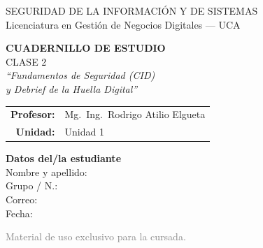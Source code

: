 \documentclass[12pt,a4paper]{article}
\begin{document}
\begin{titlepage}
\centering
\vspace*{1cm}

\begin{cajaTitulo}[width=\textwidth, halign=center]
  SEGURIDAD DE LA INFORMACI\'ON Y DE SISTEMAS\\[4pt]
  {\large Licenciatura en Gesti\'on de Negocios Digitales --- UCA}
\end{cajaTitulo}

\vspace{1.5cm}

{\Huge\bfseries\color{azulUCA} CUADERNILLO DE ESTUDIO}\\[8pt]
{\LARGE\color{doradoUCA} CLASE 2}\\[12pt]
{\Large\itshape ``Fundamentos de Seguridad (CID)\\[2pt] y Debrief de la Huella Digital''}\\[1.5cm]

\begin{tabular}{rl}
\textbf{Profesor:}   & Mg.\ Ing.\ Rodrigo Atilio Elgueta \\[4pt]
\textbf{Unidad:}     & Unidad 1 \\[4pt]
\end{tabular}

\vfill

\begin{tcolorbox}[colback=grisClaro, colframe=azulUCA, arc=3mm, width=0.9\textwidth]
  \centering
  {\bfseries Datos del/la estudiante}\\[10pt]
  Nombre y apellido: \underline{\hspace{5cm}}\\[10pt]
  Grupo / N.\textdegree: \underline{\hspace{5cm}}\\[10pt]
  Correo: \underline{\hspace{5cm}}\\[10pt]
  Fecha: \underline{\hspace{5cm}}
\end{tcolorbox}

\vspace{1cm}
{\small\textcolor{gray}{Material de uso exclusivo para la cursada.}}
\end{titlepage}

\tableofcontents
\newpage
\end{document}
